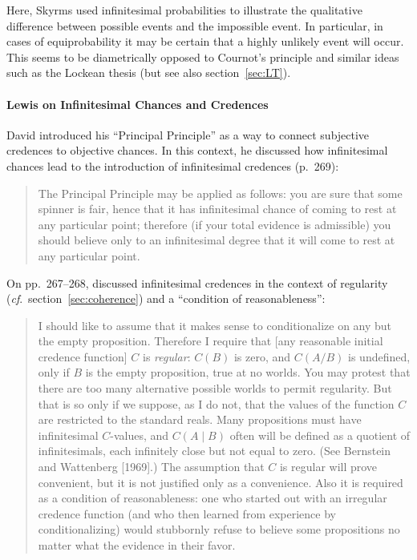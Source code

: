 Here, Skyrms used infinitesimal probabilities to illustrate the qualitative difference between possible events and the impossible event. In particular, in cases of equiprobability it may be certain that a highly unlikely event will occur. This seems to be diametrically opposed to Cournot's principle and similar ideas such as the Lockean thesis (but see also section~\ref{sec:LT}).

\paragraph{Lewis on Infinitesimal Chances and Credences}
David \citet{Lewis:1980} introduced his ``Principal Principle'' as a way to connect subjective credences to objective chances. In this context, he discussed how infinitesimal chances lead to the introduction of infinitesimal credences (p.~269):
\begin{quote}
The Principal Principle may be applied as follows: you are sure that some spinner is fair, hence that it has infinitesimal chance of coming to rest at any particular point; therefore (if your total evidence is admissible) you should believe only to an infinitesimal degree that it will come to rest at any particular point.
\end{quote}
On pp.~267--268, \citet{Lewis:1980} discussed infinitesimal credences in the context of regularity (\textit{cf}.\ section~\ref{sec:coherence}) and a ``condition of reasonableness'':
\begin{quote}
I should like to assume that it makes sense to conditionalize on any but the empty proposition. Therefore I require that [any reasonable initial credence function] $C$ is \textit{regular}: $C(B)$ is zero, and $C(A/B)$ is undefined, only if $B$ is the empty proposition, true at no worlds. You may protest that there are too many alternative possible worlds to permit regularity. But that is so only if we suppose, as I do not, that the values of the function $C$ are restricted to the standard reals. Many propositions must have infinitesimal $C$-values, and $C(A \mid B)$ often will be defined as a quotient of infinitesimals, each infinitely close but not equal to zero. (See Bernstein and Wattenberg [1969].) The assumption that $C$ is regular will prove convenient, but it is not justified only as a convenience. Also it is required as a condition of reasonableness: one who started
out with an irregular credence function (and who then learned from experience by conditionalizing) would stubbornly refuse to believe some propositions no matter what the evidence in their favor.
\end{quote}

